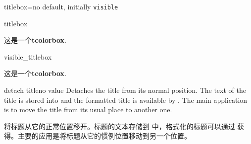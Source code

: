 \begin{docTcbKey}[][doc new=2019-03-01]{titlebox}{=}{no default, initially \texttt{visible}}
\begin{exdispExample}{titlebox}
\begin{tcolorbox}[title=我的不可见标题,
  titlebox=invisible]
这是一个\textbf{tcolorbox}.
\end{tcolorbox}
\end{exdispExample}

\begin{exdispExample}{visible_titlebox}
  \begin{tcolorbox}[title=我的可见标题,
    titlebox=visible]
这是一个\textbf{tcolorbox}.
  \end{tcolorbox}
  \end{exdispExample}
\end{docTcbKey}



\begin{docTcbKey}{detach title}{}{no value}
Detaches the title from its normal position. The text of the title is
stored into  and the formatted title is
available by .
The main application is to move the title from its usual place to another one.
  
将标题从它的正常位置移开。标题的文本存储到  中，格式化的标题可以通过  获得。主要的应用是将标题从它的惯例位置移动到另一个位置。

 
\end{docTcbKey}


